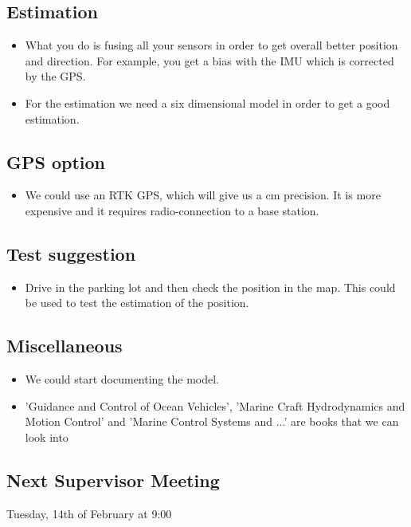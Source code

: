 \subsection{Estimation}
\begin{itemize}
	\item What you do is fusing all your sensors in order to get overall better position and direction. For example, you get a bias with the IMU which is corrected by the GPS.
	\item For the estimation we need a six dimensional model in order to get a good estimation.
\end{itemize}
\subsection{GPS option}
\begin{itemize}
	\item We could use an RTK GPS, which will give us a cm precision. It is more expensive and it requires radio-connection to a base station.
\end{itemize}
\subsection{Test suggestion}
\begin{itemize}
	\item Drive in the parking lot and then check the position in the map. This could be used to test the estimation of the position.
\end{itemize}
\subsection{Miscellaneous}
\begin{itemize}
	\item We could start documenting the model.
	\item 'Guidance and Control of Ocean Vehicles', 'Marine Craft Hydrodynamics and Motion Control' and 'Marine Control Systems and ...' are books that we can look into
\end{itemize}
\subsection{Next Supervisor Meeting}
Tuesday, 14th of February at 9:00

